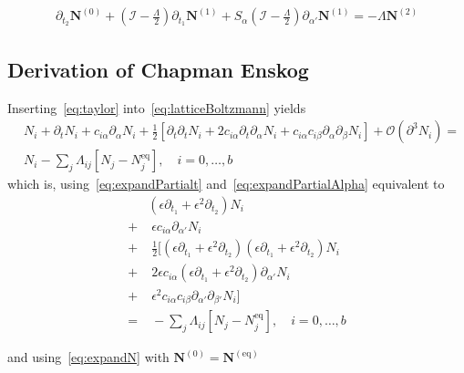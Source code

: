 \documentclass[]{article}
\begin{document}
\begin{equation}
	\begin{aligned}
		\partial_{t_2} \boldsymbol{N}^{(0)} + (\mathcal{I}-\frac{\Lambda}{2} )\partial_{t_1} \boldsymbol{N}^{(1)} + S_\alpha  (\mathcal{I}-\frac{\Lambda}{2} ) \partial_{\alpha'}  \boldsymbol{N}^{(1)}
		= - \Lambda  \boldsymbol{N}^{(2)}
	\end{aligned}
\end{equation}


\newpage
\begin{appendices}
 \section{Derivation of Chapman Enskog}
\label{sec:Derivation of Chapman Enskog}

Inserting~\eqref{eq:taylor} into~\eqref{eq:latticeBoltzmann} yields
\begin{equation*}
	\begin{aligned}
		&N_i + \partial_t N_i + c_{i\alpha}\partial_\alpha N_i + \frac{1}{2} [\partial_t\partial_t N_i + 2c_{i\alpha}\partial_t\partial_\alpha N_i + c_{i\alpha}c_{i\beta}\partial_\alpha\partial_\beta N_i] + \mathcal{O}(\partial^3 N_i) = \\ &N_i  - \sum_j \Lambda_{ij} [N_j - N_j^{\text{eq}} ], \quad i = 0, \dots, b
	\end{aligned}
\end{equation*}
which is, using~\eqref{eq:expandPartialt} and~\eqref{eq:expandPartialAlpha} equivalent to
\begin{equation*}
	\begin{aligned}
		& (\epsilon\partial_{t_1} + \epsilon^2\partial_{t_2}) N_i \\
		+ &\; \epsilon c_{i\alpha}\partial_{\alpha'} N_i \\
		+ &\; \frac{1}{2} [(\epsilon\partial_{t_1} + \epsilon^2\partial_{t_2})(\epsilon\partial_{t_1} + \epsilon^2\partial_{t_2}) N_i \\
		+ &\; 2 \epsilon c_{i\alpha}(\epsilon\partial_{t_1} + \epsilon^2\partial_{t_2}) \partial_{\alpha'} N_i \\
		+ &\; \epsilon^2 c_{i\alpha}c_{i\beta}\partial_{\alpha'}\partial_{\beta'} N_i]\\
		= &\; - \sum_j \Lambda_{ij} [N_j - N_j^{\text{eq}} ], \quad i = 0, \dots, b
	\end{aligned}
\end{equation*}

and using~\eqref{eq:expandN} with $\boldsymbol{N}^{(0)} = \boldsymbol{N}^{(\text{eq})}$


\end{appendices}
\end{document}
